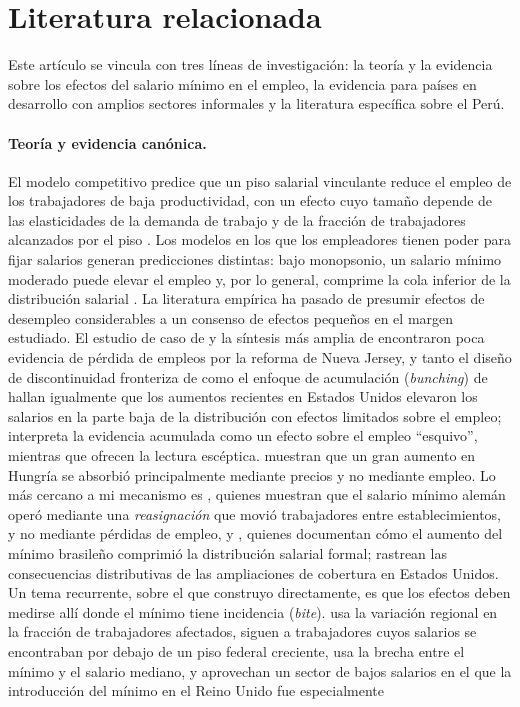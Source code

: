 \section{Literatura relacionada}\label{sec:literature}

Este artículo se vincula con tres líneas de investigación: la teoría y la evidencia sobre los efectos del salario mínimo en el empleo, la evidencia para países en desarrollo con amplios sectores informales y la literatura específica sobre el Perú.

\paragraph{Teoría y evidencia canónica.} El modelo competitivo predice que un piso salarial vinculante reduce el empleo de los trabajadores de baja productividad, con un efecto cuyo tamaño depende de las elasticidades de la demanda de trabajo y de la fracción de trabajadores alcanzados por el piso \citep{brown_1999}. Los modelos en los que los empleadores tienen poder para fijar salarios generan predicciones distintas: bajo monopsonio, un salario mínimo moderado puede elevar el empleo y, por lo general, comprime la cola inferior de la distribución salarial \citep{manning_2003}. La literatura empírica ha pasado de presumir efectos de desempleo considerables a un consenso de efectos pequeños en el margen estudiado. El estudio de caso de \citet{card_krueger_1994} y la síntesis más amplia de \citet{card_krueger_1995} encontraron poca evidencia de pérdida de empleos por la reforma de Nueva Jersey, y tanto el diseño de discontinuidad fronteriza de \citet{dube_lester_reich_2010} como el enfoque de acumulación (\emph{bunching}) de \citet{cengiz_2019} hallan igualmente que los aumentos recientes en Estados Unidos elevaron los salarios en la parte baja de la distribución con efectos limitados sobre el empleo; \citet{manning_2021} interpreta la evidencia acumulada como un efecto sobre el empleo ``esquivo'', mientras que \citet{neumark_wascher_2007} ofrecen la lectura escéptica. \citet{harasztosi_lindner_2019} muestran que un gran aumento en Hungría se absorbió principalmente mediante precios y no mediante empleo. Lo más cercano a mi mecanismo es \citet{dustmann_2022}, quienes muestran que el salario mínimo alemán operó mediante una \emph{reasignación} que movió trabajadores entre establecimientos, y no mediante pérdidas de empleo, y \citet{engbom_moser_2022}, quienes documentan cómo el aumento del mínimo brasileño comprimió la distribución salarial formal; \citet{derenoncourt_montialoux_2021} rastrean las consecuencias distributivas de las ampliaciones de cobertura en Estados Unidos. Un tema recurrente, sobre el que construyo directamente, es que los efectos deben medirse allí donde el mínimo tiene incidencia (\emph{bite}). \citet{card_1992} usa la variación regional en la fracción de trabajadores afectados, \citet{clemens_wither_2019} siguen a trabajadores cuyos salarios se encontraban por debajo de un piso federal creciente, \citet{lee_1999} usa la brecha entre el mínimo y el salario mediano, y \citet{machin_manning_rahman_2003} aprovechan un sector de bajos salarios en el que la introducción del mínimo en el Reino Unido fue especialmente 